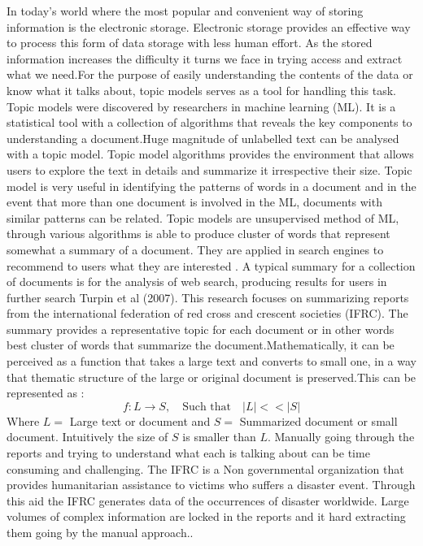 In today's world where the most popular and convenient way of storing information is the electronic storage. Electronic storage provides an effective way to process this form of data storage with less human effort. As the stored information increases the difficulty it turns we face in trying access and extract what we need.For the purpose of easily understanding the contents of the data or know what it talks about, topic models serves as a tool for handling this task.
Topic models were discovered by researchers in  machine learning (ML).  It is a statistical tool with a collection of algorithms that reveals the key components to understanding a document.Huge magnitude of unlabelled text can be analysed with a topic model. Topic model algorithms provides the environment that allows   users to explore the text in details and summarize it irrespective their size. Topic model is very useful in identifying the patterns of words in a document and in the event that more than one document is involved in the ML, documents with similar patterns can be related. 
Topic models are unsupervised method of ML, through various algorithms is able to produce cluster of words that represent somewhat a summary of a document. They are applied in search engines to recommend to users what they are interested . A typical summary for a collection of documents is for the analysis of web search, producing results for users in further search Turpin et al (2007).  This research focuses on summarizing reports from the international federation of red cross and crescent societies (IFRC). The summary provides  a  representative topic for each document or in other words best cluster of words that summarize the document.Mathematically, it can be perceived as a function that takes a large text and converts to small one, in a way that thematic structure of the large or original document is preserved.This can be represented as :
$$f:L \longrightarrow S, \quad \text{Such that} \quad |L| << |S|      $$
Where $L=$ Large text or document and $S=$ Summarized document or small document.
Intuitively the size of $S$ is smaller than $L$.
Manually going through the reports and trying to understand what each is talking about can be time consuming and challenging. The IFRC is a Non governmental organization
that provides humanitarian assistance to victims who suffers a disaster event. Through this aid the 	IFRC generates data of the occurrences of disaster worldwide. Large volumes of complex information    are locked in the reports and it hard extracting them going by the manual approach.. 
